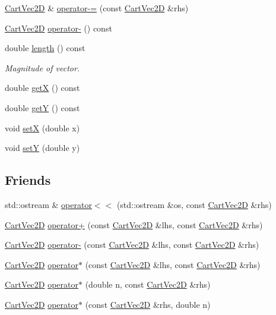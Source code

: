 \begin{DoxyCompactItemize}
\hyperlink{class_cart_vec2_d}{Cart\+Vec2D} \& \hyperlink{class_cart_vec2_d_a6cc6a41f907b69514a9689bca6d8dd53}{operator-\/=} (const \hyperlink{class_cart_vec2_d}{Cart\+Vec2D} \&rhs)
\item 
\hyperlink{class_cart_vec2_d}{Cart\+Vec2D} \hyperlink{class_cart_vec2_d_a5ec1f6b49f1c013302799d95f6c17d33}{operator-\/} () const 
\item 
double \hyperlink{class_cart_vec2_d_ac18820336e7e22bf909c9fefff307c9d}{length} () const 
\begin{DoxyCompactList}\small\item\em Magnitude of vector. \end{DoxyCompactList}\item 
double \hyperlink{class_cart_vec2_d_aafde5f075265409f2cbcd6f14bf5cbe1}{getX} () const 
\item 
double \hyperlink{class_cart_vec2_d_a0ad31fa5e9398132c38e548189ca89a1}{getY} () const 
\item 
void \hyperlink{class_cart_vec2_d_ab639eb35be2e12b043fd905a912d367a}{setX} (double x)
\item 
void \hyperlink{class_cart_vec2_d_ad9024978cb20db5e11e8be7d13b51055}{setY} (double y)
\end{DoxyCompactItemize}
\subsection*{Friends}
\begin{DoxyCompactItemize}
\item 
std\+::ostream \& \hyperlink{class_cart_vec2_d_a9b8a3e8f8c11b0b30560a2ecc6996eb0}{operator$<$$<$} (std\+::ostream \&os, const \hyperlink{class_cart_vec2_d}{Cart\+Vec2D} \&rhs)
\item 
\hyperlink{class_cart_vec2_d}{Cart\+Vec2D} \hyperlink{class_cart_vec2_d_a221f353e4cc614c6220d4b9362082e1d}{operator+} (const \hyperlink{class_cart_vec2_d}{Cart\+Vec2D} \&lhs, const \hyperlink{class_cart_vec2_d}{Cart\+Vec2D} \&rhs)
\item 
\hyperlink{class_cart_vec2_d}{Cart\+Vec2D} \hyperlink{class_cart_vec2_d_a596a5c2c5a21d5cb423b81b3434a508e}{operator-\/} (const \hyperlink{class_cart_vec2_d}{Cart\+Vec2D} \&lhs, const \hyperlink{class_cart_vec2_d}{Cart\+Vec2D} \&rhs)
\item 
\hyperlink{class_cart_vec2_d}{Cart\+Vec2D} \hyperlink{class_cart_vec2_d_a6eb8393d1dae60c826374b058caeac4c}{operator$\ast$} (const \hyperlink{class_cart_vec2_d}{Cart\+Vec2D} \&lhs, const \hyperlink{class_cart_vec2_d}{Cart\+Vec2D} \&rhs)
\item 
\hyperlink{class_cart_vec2_d}{Cart\+Vec2D} \hyperlink{class_cart_vec2_d_aaf50bea49ba3f5c0b50aa0151a78d464}{operator$\ast$} (double n, const \hyperlink{class_cart_vec2_d}{Cart\+Vec2D} \&rhs)
\item 
\hyperlink{class_cart_vec2_d}{Cart\+Vec2D} \hyperlink{class_cart_vec2_d_a5b2381590093015b51800138fe859ec7}{operator$\ast$} (const \hyperlink{class_cart_vec2_d}{Cart\+Vec2D} \&rhs, double n)
\end{DoxyCompactItemize}



